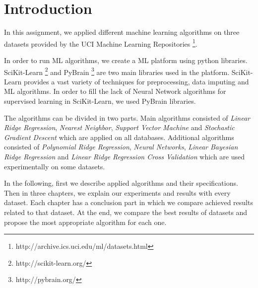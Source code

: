 \section{Introduction}
In this assignment, we applied different machine learning algorithms on three datasets provided by the UCI Machine Learning Repositories \footnote{http://archive.ics.uci.edu/ml/datasets.html}.

In order to run ML algorithms, we create a ML platform using python libraries. SciKit-Learn \footnote{http://scikit-learn.org/} and PyBrain  \footnote{http://pybrain.org/} are two main libraries used in the platform. SciKit-Learn provides a vast variety of techniques for preprocessing, data imputing and ML algorithms. In order to fill the lack of Neural Network algorithms for supervised learning in SciKit-Learn, we used PyBrain libraries.

The algorithms can be divided in two parts. Main algorithms consisted of \textit{Linear Ridge Regression}, \textit{Nearest Neighbor}, \textit{Support Vector Machine} and \textit{Stochastic Gradient Descent} which are applied on  all databases. Additional algorithms consisted of \textit{Polynomial Ridge Regression}, \textit{Neural Networks}, \textit{Linear Bayesian Ridge Regression} and \textit{Linear Ridge Regression Cross Validation} which are used experimentally on some datasets.

In the following, first we describe applied algorithms and their specifications. Then in three chapters, we explain our experiments and results with every dataset. Each chapter has a conclusion part in which we compare achieved results related to that dataset. At the end, we compare the best results of datasets and propose the most appropriate algorithm for each one.
